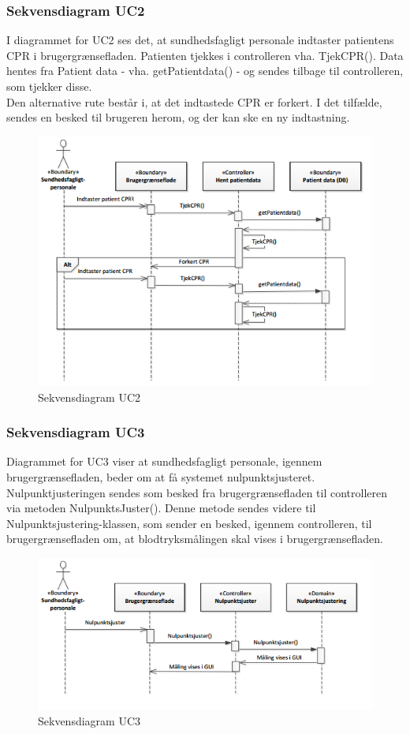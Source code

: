 \subsubsection{Sekvensdiagram UC2}
I diagrammet for UC2 ses det, at sundhedsfagligt personale indtaster patientens CPR i brugergrænsefladen. Patienten tjekkes i controlleren vha. TjekCPR(). Data hentes fra Patient data - vha. getPatientdata() - og sendes tilbage til controlleren, som tjekker disse. \\
Den alternative rute består i, at det indtastede CPR er forkert. I det tilfælde, sendes en besked til brugeren herom, og der kan ske en ny indtastning.
\begin{figure}[H]
\centering
\includegraphics[scale=0.70]{sd2.PNG}
\caption{Sekvensdiagram UC2}
\end{figure}

\subsubsection{Sekvensdiagram UC3}
Diagrammet for UC3 viser at sundhedsfagligt personale, igennem brugergrænsefladen, beder om at få systemet nulpunktsjusteret. Nulpunktjusteringen sendes som besked fra brugergrænsefladen til controlleren via metoden NulpunktsJuster(). Denne metode sendes videre til Nulpunktsjustering-klassen, som sender en besked, igennem controlleren, til brugergrænsefladen om, at blodtryksmålingen skal vises i brugergrænsefladen.
\begin{figure}[H]
\centering
\includegraphics[scale=0.70]{sd3.PNG}
\caption{Sekvensdiagram UC3}
\end{figure}

